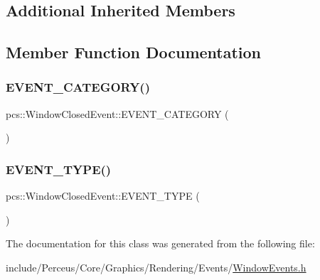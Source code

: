\subsection*{Additional Inherited Members}


\subsection{Member Function Documentation}
\mbox{\label{classpcs_1_1WindowClosedEvent_a01cbccdbd9cdf31dcda990e6dde02ebc}} 
\subsubsection{\texorpdfstring{E\+V\+E\+N\+T\+\_\+\+C\+A\+T\+E\+G\+O\+R\+Y()}{EVENT\_CATEGORY()}}
{\footnotesize\ttfamily pcs\+::\+Window\+Closed\+Event\+::\+E\+V\+E\+N\+T\+\_\+\+C\+A\+T\+E\+G\+O\+RY (\begin{DoxyParamCaption}\item[{\hyperlink{namespacepcs_a3538ef524602fc09ddb40acc72480c60a5fb31ca24b241c5c6af3df6930ef53ba}{Window\+Event}}]{ }\end{DoxyParamCaption})}

\mbox{\label{classpcs_1_1WindowClosedEvent_a3be0e69e0cb2de9b4f5d1845bc3735cb}} 
\subsubsection{\texorpdfstring{E\+V\+E\+N\+T\+\_\+\+T\+Y\+P\+E()}{EVENT\_TYPE()}}
{\footnotesize\ttfamily pcs\+::\+Window\+Closed\+Event\+::\+E\+V\+E\+N\+T\+\_\+\+T\+Y\+PE (\begin{DoxyParamCaption}\item[{\hyperlink{namespacepcs_a12954f53e3d7d6a8765fd723e1ce8db4a7c87dff2b968b5c85baf1def063c776d}{Window\+Closed}}]{ }\end{DoxyParamCaption})}



The documentation for this class was generated from the following file\+:\begin{DoxyCompactItemize}
\item 
include/\+Perceus/\+Core/\+Graphics/\+Rendering/\+Events/\hyperlink{WindowEvents_8h}{Window\+Events.\+h}\end{DoxyCompactItemize}
